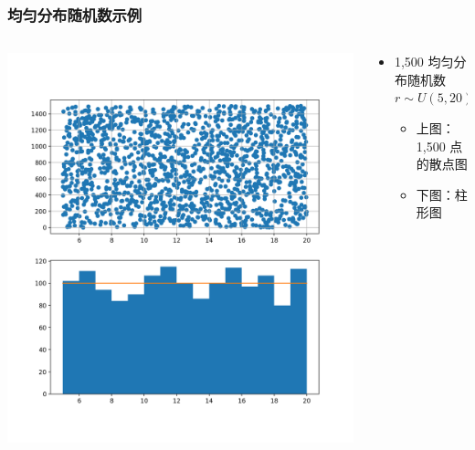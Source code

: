 \documentclass[serif,aspectratio=169]{beamer}
\begin{document}
\begin{frame}
  \frametitle{均匀分布随机数示例}
  \begin{columns}
    \begin{column}{.5\textwidth}
      \centering
      \includegraphics[width=.9\textwidth]{img/runif.png}
    \end{column}
    \begin{column}{.5\textwidth}
      \begin{itemize}
      \item 1,500 均匀分布随机数 $r\sim U(5,20)$
        \begin{itemize}
        \item 上图：1,500 点的散点图
        \item 下图：柱形图
        \end{itemize}
      \end{itemize}
    \end{column}
  \end{columns}
\end{frame}
\end{document}
